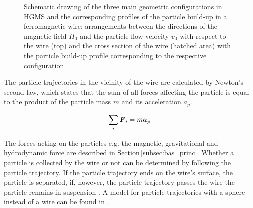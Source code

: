 \begin{figure}[h]
\centering

\caption[Geometric configurations in HGMS and particle build-up]{Schematic drawing of the three main geometric configurations in HGMS and the corresponding profiles of the particle build-up in a ferromagnetic wire; arrangements between the directions of the magnetic field $H_{0}$ and the particle flow velocity $v_{0}$ with respect to the wire (top) and the cross section of the wire (hatched area) with the particle build-up profile corresponding to the respective configuration \cite{svoboda2004magnetic}
\label{fig:hgms_config}
}
\end{figure}

The particle trajectories in the vicinity of the wire are calculated by Newton's second law, which states that the sum of all forces affecting the particle is equal to the product of the particle mass $m$ and its acceleration $a_{p}$. 

\begin{equation}
\label{eq:mag_force_sum}
\centering
\sum_{i}\boldsymbol{F}_{i} = m\boldsymbol{a}_{p}
\end{equation}
 
The forces acting on the particles e.g. the magnetic, gravitational and hydrodynamic force are described in Section\,\ref{subsec:bas_princ}. Whether a particle is collected by the wire or not can be determined by following the particle trajectory. If the particle trajectory ends on the wire's surface, the particle is separated, if, however, the particle trajectory passes the wire the particle remains in suspension \cite{FranzrebHabil}. A model for particle trajectories with a sphere instead of a wire can be found in \cite{friedlaender1981particle,moyer1986filtration}.
 
